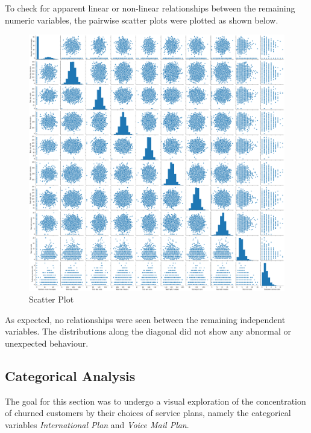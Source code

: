\documentclass{article}
\begin{document}
To check for apparent linear or non-linear relationships between the remaining numeric variables, the pairwise scatter plots were plotted as shown below.
\begin{figure}[H]
	\begin{center}
		\includegraphics[scale=0.15]{pair.png}
	\end{center}
	\caption{Scatter Plot}
\end{figure}
As expected, no relationships were seen between the remaining independent variables. The distributions along the diagonal did not show any abnormal or unexpected behaviour.

\subsection{Categorical Analysis}

The goal for this section was to undergo a visual exploration of the concentration of churned customers by their choices of service plans, namely the categorical variables \textit{International Plan} and \textit{Voice Mail Plan}.
\end{document}
